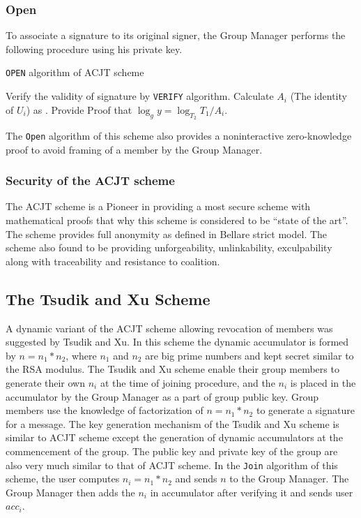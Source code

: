 \subsubsection{Open}
To associate a signature to its original signer, the Group Manager performs the following procedure using his private key.
\begin{algorithm}
\caption{\texttt{OPEN} algorithm of ACJT scheme}
\begin{algorithmic}[1]
\STATE Verify the validity of signature by \texttt{VERIFY} algorithm.
\STATE Calculate $A_i$ (The identity of $U_i$) as .
\STATE Provide Proof that $\log_g y = \log_{T_2}{T_1 / A_i}$.
\end{algorithmic}
\end{algorithm}

The \texttt{Open} algorithm of this scheme also provides a noninteractive zero-knowledge proof to avoid framing of a member by the Group Manager.

\subsubsection{Security of the ACJT scheme}
The ACJT scheme is a Pioneer in providing a most secure scheme with mathematical proofs that why this scheme is considered to be \textquotedblleft state of the art\textquotedblright. The scheme provides full anonymity as defined in Bellare strict model\cite{bellare2003foundations}. The scheme also found to be providing unforgeability, unlinkability, exculpability along with traceability and resistance to coalition.

\subsection{The Tsudik and Xu Scheme}\label{TX}
A dynamic variant of the ACJT scheme allowing revocation of members was suggested by Tsudik and Xu\cite{tsudik2003accumulating}. In this scheme the dynamic accumulator is formed by $n = n_1 * n_2$,  where $n_1$ and $n_2$ are big prime numbers and kept secret similar to the RSA modulus. The Tsudik and Xu scheme enable their group members to generate their own $n_i$ at the time of joining procedure, and the $n_i$ is placed in the accumulator by the Group Manager as a part of group public key. Group members use the knowledge of factorization of $n = n_1 * n_2$ to generate a signature for a message. The key generation mechanism of the Tsudik and Xu scheme is similar to ACJT scheme except the generation of dynamic accumulators at the commencement of the group. The public key and private key of the group are also very much similar to that of ACJT scheme. In the \texttt{Join} algorithm of this scheme, the user computes $n_i = n_1 * n_2$ and sends $n$ to the Group Manager. The Group Manager then adds the $n_i$ in accumulator after verifying it and sends user $acc_i$.


